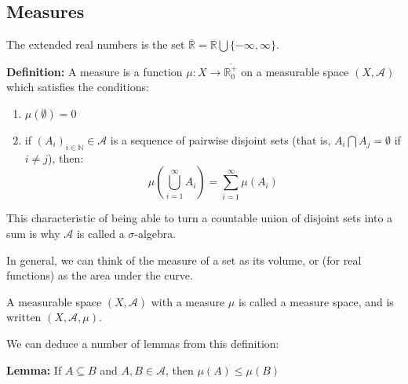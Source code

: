 \documentclass{article}
\begin{document}

\subsection{Measures}

The extended real numbers is the set $ =  \bigcup \{-\infty, \infty\}$.

\textbf{Definition:} A measure is a function $\mu:X \rightarrow {}$ on a
measurable space $(X, )$ which satisfies the conditions:

\begin{enumerate}
	\item $\mu(\emptyset) = 0$
	\item if $(A_i)_{i \in {}} \in {}$ is a sequence of pairwise disjoint
		sets (that is, $A_i \bigcap A_j = \emptyset$ if $i \ne j$), then:
		\[ \mu \left( \bigcup_{i =1}^{\infty} A_i \right) = \sum_{i=1}^{\infty} \mu
		\left( A_i \right) \]
\end{enumerate}

This characteristic of being able to turn a countable union of disjoint sets into a sum is why
$$ is called a $\sigma$-algebra.

In general, we can think of the measure of a set as its volume, or (for real functions) as
the area under the curve.

A measurable space $(X, )$ with a measure $\mu$ is called a measure space, and
is written $(X, , \mu)$.

We can deduce a number of lemmas from this definition:

\textbf{Lemma:} If $A \subseteq B$ and $A, B \in {}$, then $\mu(A) \le \mu(B)$
\end{document}
